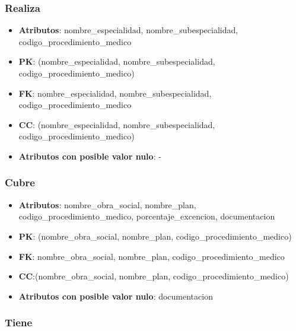 \documentclass[a4paper,11pt]{article}
\begin{document}
\subsubsection{\textbf{Realiza}}

\begin{itemize}

\item 
\textbf{Atributos}: nombre\_especialidad, nombre\_subespecialidad, codigo\_procedimiento\_medico

\item 
\textbf{PK}: (nombre\_especialidad, nombre\_subespecialidad, codigo\_procedimiento\_medico)

\item
\textbf{FK}: nombre\_especialidad, nombre\_subespecialidad, codigo\_procedimiento\_medico 

\item 
\textbf{CC}: (nombre\_especialidad, nombre\_subespecialidad, codigo\_procedimiento\_medico)

\item 
\textbf{Atributos con posible valor nulo}: -

\end{itemize}
\subsubsection{\textbf{Cubre}}

\begin{itemize}

\item 
\textbf{Atributos}: nombre\_obra\_social, nombre\_plan, codigo\_procedimiento\_medico,
porcentaje\_excencion, documentacion

\item 
\textbf{PK}: (nombre\_obra\_social, nombre\_plan, codigo\_procedimiento\_medico)

\item
\textbf{FK}: nombre\_obra\_social, nombre\_plan, codigo\_procedimiento\_medico 

\item 
\textbf{CC}:(nombre\_obra\_social, nombre\_plan, codigo\_procedimiento\_medico)

\item 
\textbf{Atributos con posible valor nulo}: documentacion

\end{itemize}
\subsubsection{\textbf{Tiene}}
\end{document}
